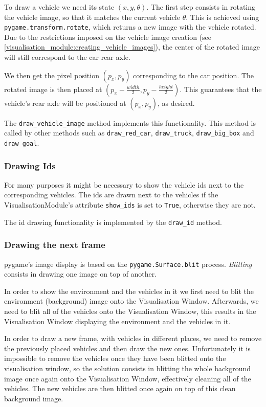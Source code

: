 To draw a vehicle we need its state $(x,y,\theta)$. The first step consists in rotating the vehicle image, so that it matches the current vehicle $\theta$. This is achieved using \texttt{pygame.transform.rotate}, which returns a new image with the vehicle rotated. Due to the restrictions imposed on the vehicle image creation (see \ref{visualisation_module:creating_vehicle_images}), the center of the rotated image will still correspond to the car rear axle.

We then get the pixel position $(p_x,p_y)$ corresponding to the car position. The rotated image is then placed at $(p_x - \frac{width}{2}, p_y - \frac{height}{2})$. This guarantees that the vehicle's rear axle will be positioned at $(p_x,p_y)$, as desired.

The \texttt{draw\_vehicle\_image} method implements this functionality. This method is called by other methods such as \texttt{draw\_red\_car}, \texttt{draw\_truck}, \texttt{draw\_big\_box} and \texttt{draw\_goal}.

\subsubsection{Drawing Ids}

For many purposes it might be necessary to show the vehicle ids next to the corresponding vehicles. The ids are drawn next to the vehicles if the VisualisationModule's attribute \texttt{show\_ids} is set to \texttt{True}, otherwise they are not.

The id drawing functionality is implemented by the \texttt{draw\_id} method.

\subsubsection{Drawing the next frame}

pygame's image display is based on the \texttt{pygame.Surface.blit} process. \textit{Blitting} consists in drawing one image on top of another.

In order to show the environment and the vehicles in it we first need to blit the environment (background) image onto the Visualisation Window. Afterwards, we need to blit all of the vehicles onto the Visualisation Window, this results in the Visualisation Window displaying the environment and the vehicles in it.

In order to draw a new frame, with vehicles in different places, we need to remove the previously placed vehicles and then draw the new ones. Unfortunately it is impossible to remove the vehicles once they have been blitted onto the visualisation window, so the solution consists in blitting the whole background image once again onto the Visualisation Window, effectively cleaning all of the vehicles. The new vehicles are then blitted once again on top of this clean background image.


